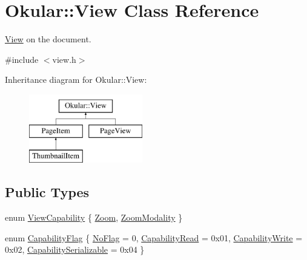 \hypertarget{classOkular_1_1View}{\section{Okular\+:\+:View Class Reference}
\label{classOkular_1_1View}
}


\hyperlink{classOkular_1_1View}{View} on the document.  




{\ttfamily \#include $<$view.\+h$>$}

Inheritance diagram for Okular\+:\+:View\+:\begin{figure}[H]
\begin{center}
\leavevmode
\includegraphics[height=3.000000cm]{classOkular_1_1View}
\end{center}
\end{figure}
\subsection*{Public Types}
\begin{DoxyCompactItemize}
\item 
enum \hyperlink{classOkular_1_1View_ad95d365554715eb1eabb79350f51b294}{View\+Capability} \{ \hyperlink{classOkular_1_1View_ad95d365554715eb1eabb79350f51b294a3fa37aa9737e4a0f9753aa398c30f667}{Zoom}, 
\hyperlink{classOkular_1_1View_ad95d365554715eb1eabb79350f51b294a2621c21053805b1e2f71fdeb069f9c35}{Zoom\+Modality}
 \}
\item 
enum \hyperlink{classOkular_1_1View_a8552668497a612628f53b5010df7a45e}{Capability\+Flag} \{ \hyperlink{classOkular_1_1View_a8552668497a612628f53b5010df7a45ead39bbacee7b7b4f74d91ed1079922353}{No\+Flag} = 0, 
\hyperlink{classOkular_1_1View_a8552668497a612628f53b5010df7a45ea129d96c4ba7ee8cc9bf91a544d07bcd3}{Capability\+Read} = 0x01, 
\hyperlink{classOkular_1_1View_a8552668497a612628f53b5010df7a45ea8d7008cfbe58531381430014358fceb3}{Capability\+Write} = 0x02, 
\hyperlink{classOkular_1_1View_a8552668497a612628f53b5010df7a45eac0b7ffc919ca2416425d9b81b7fef5d9}{Capability\+Serializable} = 0x04
 \}
\end{DoxyCompactItemize}
